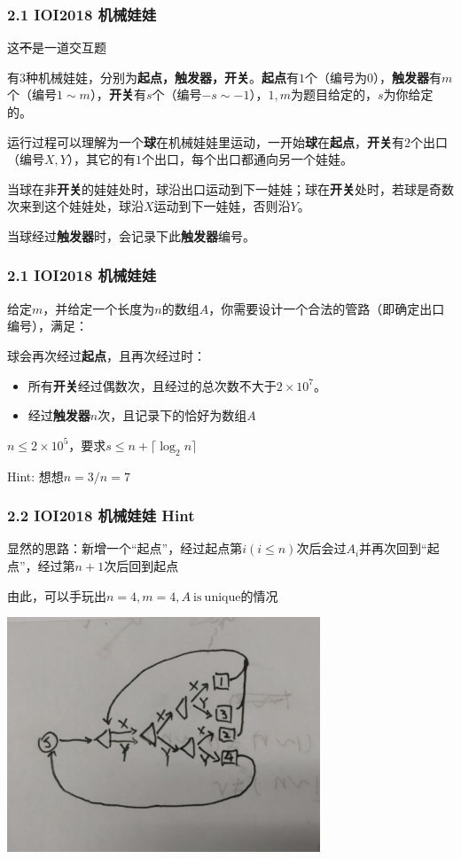 \documentclass[10pt]{beamer}
\begin{document}
\clearpage
\begin{frame}
	\frametitle{2.1 IOI2018 机械娃娃}

	这\sout{不}是一道交互题

	有$3$种机械娃娃，分别为\textbf{起点，触发器，开关}。\textbf{起点}有$1$个（编号为$0$），\textbf{触发器}有$m$个（编号$1\sim m$），\textbf{开关}有$s$个（编号$-s\sim -1$），$1,m$为题目给定的，$s$为你给定的。

	运行过程可以理解为一个\textbf{球}在机械娃娃里运动，一开始\textbf{球}在\textbf{起点}，\textbf{开关}有$2$个出口（编号$X,Y$），其它的有$1$个出口，每个出口都通向另一个娃娃。

	当球在非\textbf{开关}的娃娃处时，球沿出口运动到下一娃娃；球在\textbf{开关}处时，若球是奇数次来到这个娃娃处，球沿$X$运动到下一娃娃，否则沿$Y$。

	当球经过\textbf{触发器}时，会记录下此\textbf{触发器}编号。
\end{frame}
\clearpage
\begin{frame}
	\frametitle{2.1 IOI2018 机械娃娃}
	给定$m$，并给定一个长度为$n$的数组$A$，你需要设计一个合法的管路（即确定出口编号），满足：

	球会再次经过\textbf{起点}，且再次经过时：

	\begin{itemize}
		\item 所有\textbf{开关}经过偶数次，且经过的总次数不大于$2\times 10^7$。
		\item 经过\textbf{触发器}$n$次，且记录下的恰好为数组$A$
	\end{itemize}

	$n\le 2\times 10^5$，要求$s\le n+\lceil\log_2n\rceil$

	Hint: 想想$n=3/n=7$
\end{frame}
\clearpage
\begin{frame}
	\frametitle{2.2 IOI2018 机械娃娃 Hint}

	 显然的思路：新增一个“起点”，经过起点第$i(i\le n)$次后会过$A_i$并再次回到“起点”，经过第$n+1$次后回到起点

	 由此，可以手玩出$n=4,m=4,A\mathrm{~is~unique}$的情况
	
	 \includegraphics[width=0.7\textwidth]{2.jpg}

\end{frame}
\end{document}
